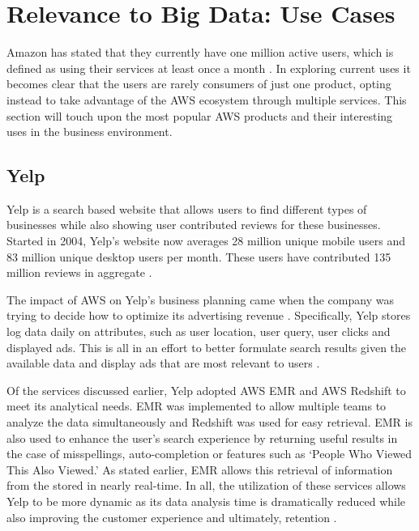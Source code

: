 \documentclass[sigconf]{acmart}
\begin{document}
\section{Relevance to Big Data: Use Cases}
Amazon has stated that they currently have one million active users, which is defined as using their services at least once a month \cite{bezos}. In exploring current uses it becomes clear that the users are rarely consumers of just one product, opting instead to take advantage of the AWS ecosystem through multiple services. This section will touch upon the most popular AWS products and their interesting uses in the business environment.
\subsection{Yelp}
Yelp is a search based website that allows users to find different types of businesses while also showing user contributed reviews for these businesses. Started in 2004, Yelp's website now averages 28 million unique mobile users and 83 million unique desktop users per month. These users have contributed 135 million reviews in aggregate \cite{yelp}. 

The impact of AWS on Yelp's business planning came when the company was trying to decide how to optimize its advertising revenue \cite{yelp_aws}. Specifically, Yelp stores log data daily on attributes, such as user location, user query, user clicks and displayed ads. This is all in an effort to better formulate search results given the available data and display ads that are most relevant to users \cite{yelp_ceo}. 

Of the services discussed earlier, Yelp adopted AWS EMR and AWS Redshift to meet its analytical needs. EMR was implemented to allow multiple teams to analyze the data simultaneously and Redshift was used for easy retrieval. EMR is also used to enhance the user's search experience by returning useful results in the case of misspellings, auto-completion or features such as `People Who Viewed This Also Viewed.'\cite{yelp_eng} As stated earlier, EMR allows this retrieval of information from the stored in nearly real-time. In all, the utilization of these services allows Yelp to be more dynamic as its data analysis time is dramatically reduced while also improving the customer experience and ultimately, retention \cite{yelp_hbr}. 
\end{document}
